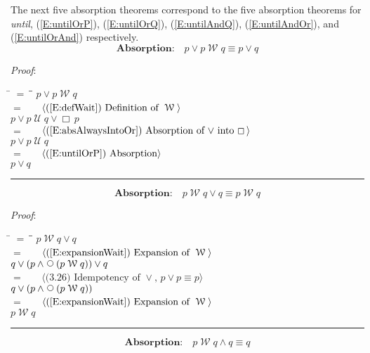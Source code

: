 \documentclass[12pt, fleqn, leqno]{article}
\newcommand{\lgap}{2pt}                             %
\newcommand{\mymathindent}{24pt}                    %
\newcommand{\Until}{\;\mathcal{U}\;}
\newcommand{\Wait}{\;\mathcal{W}\;}
\newcommand{\Next}{\;\,\text{\raisebox{3.5pt}{\circle{6}}}}
\newcommand{\Always}{\Box\,}
\newcommand{\myqed}{\rule[-.23ex]{1.2ex}{2.0ex}}
\newcommand{\myqedtab}{\hspace{384pt}}              %
\newcommand{\Gll} {\langle}                         %
\newcommand{\Ggg} {\rangle}                         %
\newcommand{\Hint}[1]     {\ \ \ $\Gll              \mbox{#1} \Ggg$ }   %
\begin{document}
The next five absorption theorems correspond to the five absorption theorems for \textit{until},
(\ref{E:untilOrP}),
(\ref{E:untilOrQ}),
(\ref{E:untilAndQ}),
(\ref{E:untilAndOr}),
and
(\ref{E:untilOrAnd})
respectively.
\begin{equation}\label{E:waitOrP}
\textbf{Absorption:}\quad p\lor p\Wait q\equiv p\lor q
\end{equation}

\emph{Proof}:
\begin{tabbing}
\hspace{\mymathindent} \= $= \;$ \= \myqedtab \= \kill
\> \> $p\lor p\Wait q$\\[\lgap]
\> $=$ \> \Hint{(\ref{E:defWait}) Definition of $\Wait$} \\[\lgap]
\> \> $p\lor p \Until q\lor \Always p$\\[\lgap]
\> $=$ \> \Hint{(\ref{E:absAlwaysIntoOr}) Absorption of $\lor$ into $\Always$} \\[\lgap]
\> \> $p\lor p \Until q$\\[\lgap]
\> $=$ \> \Hint{(\ref{E:untilOrP}) Absorption} \\[\lgap]
\> \> $p\lor q$ \quad \myqed
\end{tabbing}
\begin{equation}\label{E:waitOrQ}
\textbf{Absorption:}\quad p\Wait q\lor q\equiv p\Wait q
\end{equation}

\emph{Proof}:
\begin{tabbing}
\hspace{\mymathindent} \= $= \;$ \= \myqedtab \= \kill
\> \> $p\Wait q\lor q$\\[\lgap]
\> $=$ \> \Hint{(\ref{E:expansionWait}) Expansion of $\Wait$} \\[\lgap]
\> \> $q\lor (p\land \Next (p\Wait q)) \lor q$\\[\lgap]
\> $=$ \> \Hint{(3.26) Idempotency of $\lor$, $p \lor p \equiv p$} \\[\lgap]
\> \> $q\lor (p\land \Next (p\Wait q))$\\[\lgap]
\> $=$ \> \Hint{(\ref{E:expansionWait}) Expansion of $\Wait$} \\[\lgap]
\> \> $p\Wait q$ \quad \myqed
\end{tabbing}
\begin{equation}\label{E:waitAndQ}
\textbf{Absorption:}\quad p\Wait q\land q\equiv q
\end{equation}
\end{document}

